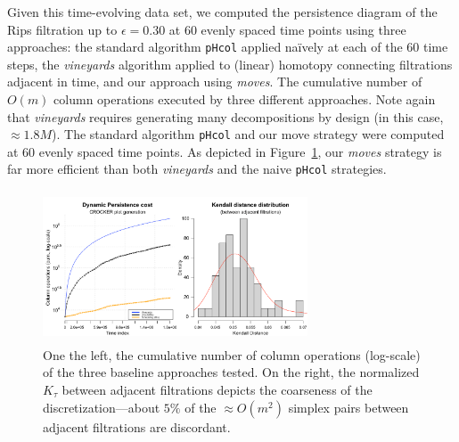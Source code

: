 \documentclass[sn-mathphys]{sn-jnl}
\begin{document}
Given this time-evolving data set, we computed the persistence diagram of the Rips filtration up to $\epsilon = 0.30$ at 60 evenly spaced time points using three approaches: the standard algorithm \texttt{pHcol} applied naïvely at each of the 60 time steps, the \emph{vineyards} algorithm applied to (linear) homotopy connecting filtrations adjacent in time, and our approach using \emph{moves}.   
The cumulative number of $O(m)$ column operations executed by three different approaches. Note again that \emph{vineyards} requires generating many decompositions by design (in this case, $\approx 1.8M$). The standard algorithm \texttt{pHcol} and our move strategy were computed at 60 evenly spaced time points. As depicted in Figure~\ref{fig:boid_sim_results}, our \emph{moves} strategy is far more efficient than both \emph{vineyards} and the naive \texttt{pHcol} strategies. 

\begin{figure}[ht]
	\centering
	\includegraphics[width=0.7\textwidth, height=12.15em]{boid_sim_results.png} %
	\caption{ One the left, the cumulative number of column operations (log-scale) of the three baseline approaches tested. On the right, the normalized $K_\tau$ between adjacent filtrations depicts the coarseness of the discretization---about $5\%$ of the $\approx O(m^2)$ simplex pairs between adjacent filtrations are discordant.}
	\label{fig:boid_sim_results}
\end{figure}
\end{document}
